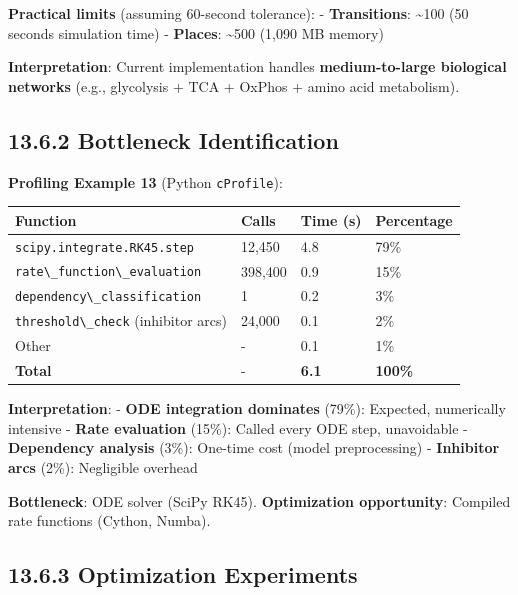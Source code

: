 \textbf{Practical limits} (assuming 60-second tolerance): -
\textbf{Transitions}: \textasciitilde100 (50 seconds simulation time) -
\textbf{Places}: \textasciitilde500 (1,090 MB memory)

\textbf{Interpretation}: Current implementation handles
\textbf{medium-to-large biological networks} (e.g., glycolysis + TCA +
OxPhos + amino acid metabolism).

\hypertarget{bottleneck-identification}{%
\subsection{13.6.2 Bottleneck
Identification}\label{bottleneck-identification}}

\textbf{Profiling Example 13} (Python
\passthrough{\lstinline!cProfile!}):

\begin{longtable}[]{@{}llll@{}}
\toprule\noalign{}
Function & Calls & Time (s) & Percentage \\
\midrule\noalign{}
\endhead
\bottomrule\noalign{}
\endlastfoot
\passthrough{\lstinline!scipy.integrate.RK45.step!} & 12,450 & 4.8 &
79\% \\
\passthrough{\lstinline!rate\_function\_evaluation!} & 398,400 & 0.9 &
15\% \\
\passthrough{\lstinline!dependency\_classification!} & 1 & 0.2 & 3\% \\
\passthrough{\lstinline!threshold\_check!} (inhibitor arcs) & 24,000 &
0.1 & 2\% \\
Other & - & 0.1 & 1\% \\
\textbf{Total} & - & \textbf{6.1} & \textbf{100\%} \\
\end{longtable}

\textbf{Interpretation}: - \textbf{ODE integration dominates} (79\%):
Expected, numerically intensive - \textbf{Rate evaluation} (15\%):
Called every ODE step, unavoidable - \textbf{Dependency analysis} (3\%):
One-time cost (model preprocessing) - \textbf{Inhibitor arcs} (2\%):
Negligible overhead

\textbf{Bottleneck}: ODE solver (SciPy RK45). \textbf{Optimization
opportunity}: Compiled rate functions (Cython, Numba).

\hypertarget{optimization-experiments}{%
\subsection{13.6.3 Optimization
Experiments}\label{optimization-experiments}}

